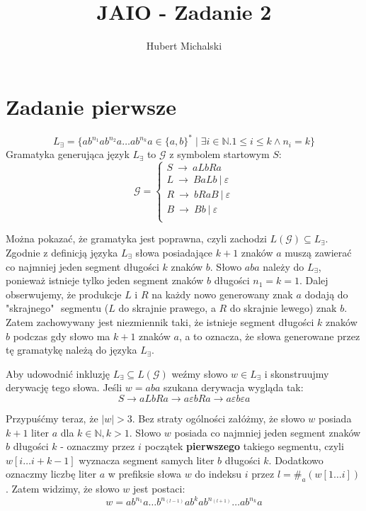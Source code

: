 \documentclass{article}
\title{JAIO - Zadanie 2}
\author{Hubert Michalski}
\begin{document}
\Large
\maketitle

\section{Zadanie pierwsze}
$$L_{\exists}=\{a b^{n_{1}} a b^{n_{2}} a \ldots a b^{n_{k}} a \in \{a,b\}^{*} \mid \exists i \in \mathbb{N}. 1 \leq i \leq k \land n_{i} = k \} $$
Gramatyka generująca język $L_{\exists}$ to $\mathcal{G}$ z symbolem startowym $S$:
$$\mathcal{G} = \begin{cases}
S \ \rightarrow \ aLbRa  \\
L \ \rightarrow \ BaLb \ | \ \varepsilon \\
R \ \rightarrow \ bRaB \ | \ \varepsilon \\
B \ \rightarrow \ Bb \ | \ \varepsilon \\
\end{cases}$$

Można pokazać, że gramatyka jest poprawna, czyli zachodzi $L(\mathcal{G}) \subseteq L_{\exists}$. Zgodnie z definicją języka $L_{\exists}$ słowa posiadające $k+1$ znaków $a$ muszą zawierać co najmniej jeden segment długości $k$ znaków $b$. Słowo $aba$ należy do $L_{\exists}$, ponieważ istnieje tylko jeden segment znaków $b$ długości $n_{1}=k=1$. Dalej obserwujemy, że produkcje $L$ i $R$ na każdy nowo generowany znak $a$ dodają do "skrajnego" $ $ segmentu ($L$ do skrajnie prawego, a $R$ do skrajnie lewego) znak $b$. Zatem zachowywany jest niezmiennik taki, że istnieje segment długości $k$ znaków $b$ podczas gdy słowo ma $k+1$ znaków $a$, a to oznacza, że słowa generowane przez tę gramatykę należą do języka $L_{\exists}$.

Aby udowodnić inkluzję $L_{\exists} \subseteq L(\mathcal{G})$ weźmy słowo $w \in L_{\exists}$ i skonstruujmy derywację tego słowa. Jeśli $w=aba$ szukana derywacja wygląda tak:
$$
S \rightarrow aLbRa \rightarrow a\varepsilon bRa \rightarrow a\varepsilon b \varepsilon a
$$

Przypuśćmy teraz, że $|w|>3$. Bez straty ogólności załóżmy, że słowo $w$ posiada $k+1$ liter $a$ dla $k \in \mathbb{N}, k > 1$. Słowo $w$ posiada co najmniej jeden segment znaków $b$ długości $k$ - oznaczmy przez $i$ początek \textbf{pierwszego} takiego segmentu, czyli $w[i\ldots i + k - 1]$ wyznacza segment samych liter $b$ długości $k$. Dodatkowo oznaczmy liczbę liter $a$ w prefiksie słowa $w$ do indeksu $i$ przez $l=\#_{a}(w[1\ldots i])$. Zatem widzimy, że słowo $w$ jest postaci:
$$
w= ab^{n_1}a \ldots b^{n_{(l-1)}} a b^{k} ab^{n_{(l+1)}} \ldots a b^{n_k} a
$$
\end{document}
